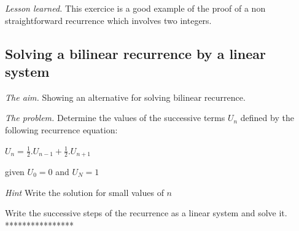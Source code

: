 {\noindent \textit{Lesson learned.}
This exercice is a good example of the proof of a non straightforward recurrence which involves two integers.

\subsection{Solving a bilinear recurrence by a linear system}

\noindent \textit{The aim.}
Showing an alternative for solving bilinear recurrence.
\medskip

\noindent \textit{The problem.}
Determine the values of the successive terms $U_n$ defined by the following recurrence equation:

$U_{n} = \frac{1}{2}.U_{n-1} + \frac{1}{2}.U_{n+1}$

given $U_0 = 0$ and $U_N = 1$
\medskip

\noindent \textit{Hint}
Write the solution for small values of $n$

Write the successive steps of the recurrence as a linear system and solve it.
****************}
